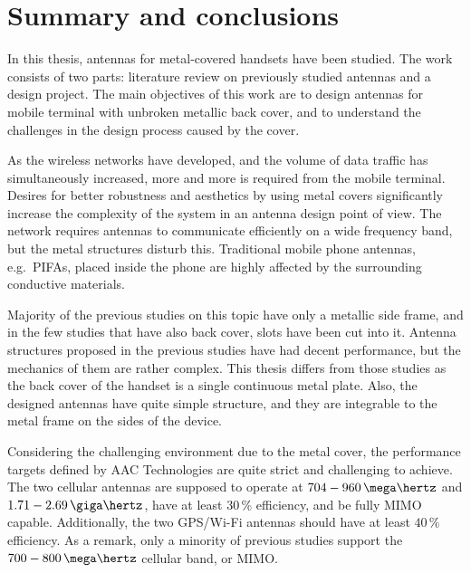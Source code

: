 \section{Summary and conclusions} 
\label{sec:conclusions}

\begin{comment}
\begin{itemize}
\item[--]yhteenveto mitä tehty
\item[--]päätulokset
\item[--]johtopäätökset
\item[--]oma arvio?
\end{itemize}
\end{comment}

In this thesis, antennas for metal-covered handsets have been studied. The work consists of two parts: literature review on previously studied antennas and a design project. The main objectives of this work are to design antennas for mobile terminal with unbroken metallic back cover, and to understand the challenges in the design process caused by the cover.

As the wireless networks have developed, and the volume of data traffic has simultaneously increased, more and more is required from the mobile terminal. Desires for better robustness and aesthetics by using metal covers significantly increase the complexity of the system in an antenna design point of view. The network requires antennas to communicate efficiently on a wide frequency band, but the metal structures disturb this. Traditional mobile phone antennas, e.g.\ PIFAs, placed inside the phone are highly affected by the surrounding conductive materials.

Majority of the previous studies on this topic have only a metallic side frame, and in the few studies that have also back cover, slots have been cut into it. Antenna structures proposed in the previous studies have had decent performance, but the mechanics of them are rather complex. This thesis differs from those studies as the back cover of the handset is a single continuous metal plate. Also, the designed antennas have quite simple structure, and they are integrable to the metal frame on the sides of the device.

Considering the challenging environment due to the metal cover, the performance targets defined by AAC Technologies are quite strict and challenging to achieve. The two cellular antennas are supposed to operate at $704-960\,\mega\hertz$ and $1.71-2.69\,\giga\hertz$, have at least 30\,\% efficiency, and be fully MIMO capable. Additionally, the two GPS/Wi-Fi antennas should have at least $40\,\%$ efficiency. As a remark, only a minority of previous studies support the $700-800\,\mega\hertz$ cellular band, or MIMO.

